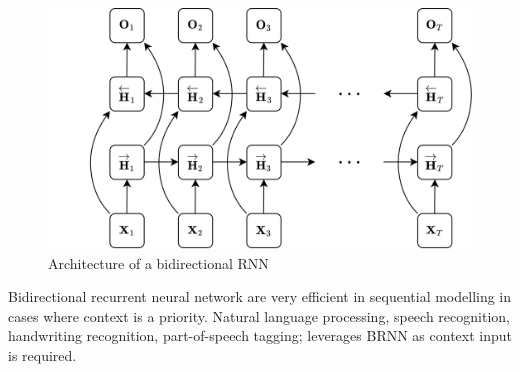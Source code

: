 \begin{figure}[H]
  \centering
  \includegraphics[scale=0.90]{CHAPTER_2/c2_fig_BRNN_draw.png}
  \caption{Architecture of a bidirectional RNN}
  \label{BRNN_LAYER}
\end{figure}
\noindent Bidirectional recurrent neural network are very efficient in sequential modelling in cases where context is a priority. Natural language processing, speech recognition, handwriting recognition, part-of-speech tagging; leverages BRNN as context input is required.